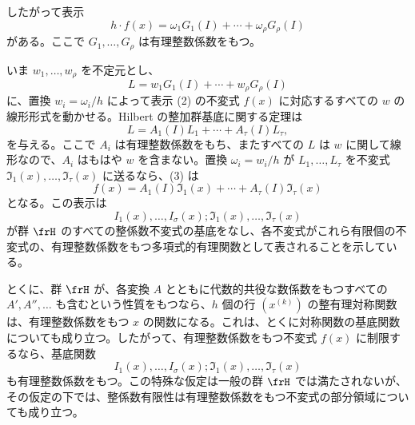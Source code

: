 \documentclass[11pt]{article}
\begin{document}
したがって表示
\begin{equation}
        h\cdot f(x)=\omega_1G_1(I)+\cdots+\omega_\rho G_\rho(I)
\end{equation}
がある。ここで \(G_1,\ldots,G_\rho\) は有理整数係数をもつ。

いま \(w_1,\ldots,w_\rho\) を不定元とし、
\[
        L=w_1G_1(I)+\cdots+w_\rho G_\rho(I)
\]
に、置換 \(w_i=\omega_i/h\) によって表示 (2) の不変式 \(f(x)\) に対応するすべての \(w\) の線形形式を動かせる。Hilbert の整加群基底に関する定理は
\begin{equation}
        L=A_1(I)L_1+\cdots+A_\tau(I)L_\tau,
\end{equation}
を与える。ここで \(A_i\) は有理整数係数をもち、またすべての \(L\) は \(w\) に関して線形なので、\(A_i\) はもはや \(w\) を含まない。置換 \(\omega_i=w_i/h\) が \(L_1,\ldots,L_\tau\) を不変式 \(\mathfrak I_1(x),\ldots,\mathfrak I_\tau(x)\) に送るなら、(3) は
\begin{equation}
        f(x)=A_1(I)\mathfrak I_1(x)+\cdots+A_\tau(I)\mathfrak I_\tau(x)
\end{equation}
となる。この表示は
\[
        I_1(x),\ldots,I_\sigma(x);\mathfrak I_1(x),\ldots,\mathfrak I_\tau(x)
\]
が群 \(\frH\) のすべての整係数不変式の基底をなし、各不変式がこれら有限個の不変式の、有理整数係数をもつ多項式的有理関数として表されることを示している。

とくに、群 \(\frH\) が、各変換 \(A\) とともに代数的共役な数係数をもつすべての \(A',A'',\ldots\) も含むという性質をもつなら、\(h\) 個の行 \((x^{(k)})\) の整有理対称関数は、有理整数係数をもつ \(x\) の関数になる。これは、とくに対称関数の基底関数についても成り立つ。したがって、有理整数係数をもつ不変式 \(f(x)\) に制限するなら、基底関数
\[
        I_1(x),\ldots,I_\sigma(x);\mathfrak I_1(x),\ldots,\mathfrak I_\tau(x)
\]
も有理整数係数をもつ。この特殊な仮定は一般の群 \(\frH\) では満たされないが、その仮定の下では、整係数有限性は有理整数係数をもつ不変式の部分領域についても成り立つ。
\end{document}
